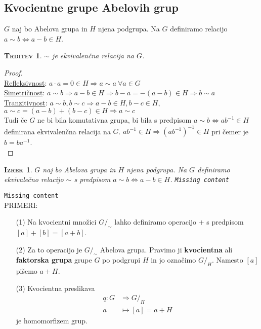 \documentclass[a4paper,12pt]{article}
\newtheorem*{trditev}{\textsc{Trditev}}
\newtheorem*{izrek}{\textsc{Izrek}}
\begin{document}
\newpage 

\subsection{Kvocientne grupe Abelovih grup}

$G$ naj bo Abelova grupa in $H$ njena podgrupa. Na $G$ definiramo relacijo $a\sim b \Leftrightarrow a-b\in H$. \\

\begin{trditev}
$\sim$ je ekvivalenčna relacija na $G$.\\
\end{trditev}

\begin{proof} ~ \\

\underline{Refleksivnost}: $a\cdot a=0\in H \Rightarrow a \sim a ~ \forall a \in G$ \\

\underline{Simetričnost}: $a\sim b \Rightarrow a-b\in H \Rightarrow b-a=-(a-b)\in H \Rightarrow b\sim a$ \\

\underline{Tranzitivnost}: $a\sim b, b\sim c \Rightarrow a-b\in H,b-c\in H$, $a\sim c=(a-b)+(b-c)\in H \Rightarrow a\sim c$ \\

Tudi če $G$ ne bi bila komutativna grupa, bi bila s predpisom $a\sim b \Leftrightarrow ab^{-1} \in H$ definirana ekvivalenčna relacija na $G$. $ab^{-1}\in H \Rightarrow (ab^{-1})^{-1}\in H$ pri čemer je $b=ba^{-1}$.\\
\end{proof}

\begin{izrek}
$G$ naj bo Abelova grupa in $H$ njena podgrupa. Na $G$ definiramo ekvivalečno relacijo $\sim$ s predpisom $a\sim b\Leftrightarrow a-b\in H$. \texttt{Missing content} \\
\end{izrek}

\texttt{Missing content} \\

PRIMERI:
\begin{itemize}
\item[(1)] Na kvocientni množici $G/_\sim$ lahko definiramo operacijo $+$ s predpisom $[a]+[b]=[a+b]$. 
\item[(2)] Za to operacijo je $G/_\sim$ Abelova grupa. Pravimo ji \textbf{kvocientna} ali \textbf{faktorska grupa} grupe $G$ po podgrupi $H$ in jo označimo $G/_H$. Namesto $[a]$ pišemo $a+H$.
\item[(3)] Kvocientna preslikava \begin{align*} q: G & \Rightarrow G/_H \\ a & \mapsto [a]=a+H \end{align*} je homomorfizem grup. \\
\end{itemize}
\end{document}
